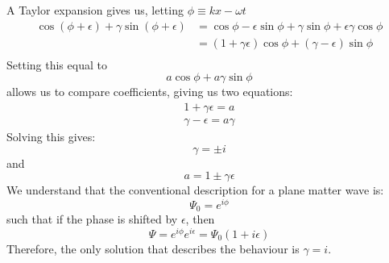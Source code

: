 \begin{sol}
A Taylor expansion gives us, letting $\phi \equiv kx-\omega t$
\begin{align*}
    \cos (\phi+\epsilon) + \gamma\sin(\phi+\epsilon) &= \cos\phi-\epsilon\sin\phi+\gamma\sin\phi+\epsilon\gamma\cos\phi \\
    &= (1+\gamma\epsilon)\cos\phi+(\gamma-\epsilon)\sin\phi \\
\end{align*}
Setting this equal to
$$a\cos\phi+a\gamma\sin\phi$$
allows us to compare coefficients, giving us two equations:
\begin{align*}
    1+\gamma\epsilon = a \\
    \gamma-\epsilon=a\gamma
\end{align*}
Solving this gives:
$$\gamma = \pm i$$
and
$$a = 1 \pm \gamma \epsilon$$
We understand that the conventional description for a plane matter wave is:
$$\Psi_0=e^{i\phi}$$
such that if the phase is shifted by $\epsilon$, then
$$\Psi=e^{i\phi}e^{i\epsilon}=\Psi_0 (1+i\epsilon)$$
Therefore, the only solution that describes the behaviour is $\gamma=i$.
\end{sol}